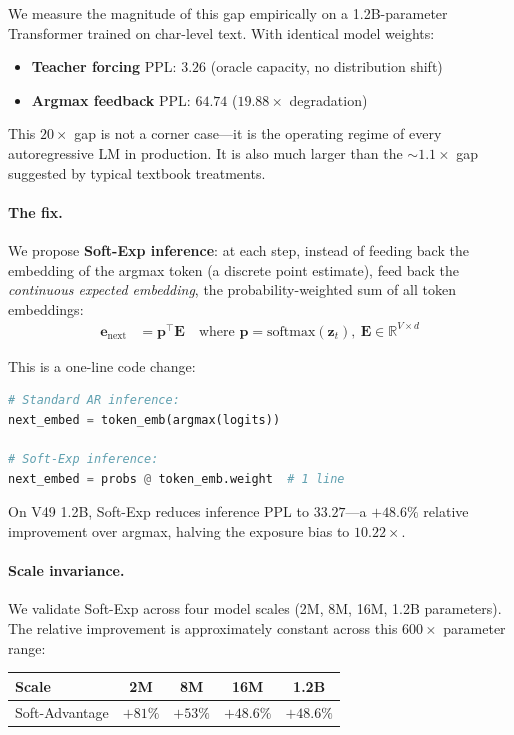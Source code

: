 \documentclass{article}
\begin{document}
We measure the magnitude of this gap empirically on a 1.2B-parameter Transformer trained on char-level text. With identical model weights:
\begin{itemize}
    \item \textbf{Teacher forcing} PPL: $3.26$ (oracle capacity, no distribution shift)
    \item \textbf{Argmax feedback} PPL: $64.74$ ($19.88\times$ degradation)
\end{itemize}

This $20\times$ gap is not a corner case---it is the operating regime of every autoregressive LM in production. It is also much larger than the $\sim 1.1\times$ gap suggested by typical textbook treatments.

\paragraph{The fix.} We propose \textbf{Soft-Exp inference}: at each step, instead of feeding back the embedding of the argmax token (a discrete point estimate), feed back the \emph{continuous expected embedding}, the probability-weighted sum of all token embeddings:
\begin{align*}
    \mathbf{e}_{\text{next}} &= \mathbf{p}^\top \mathbf{E} \quad \text{where } \mathbf{p} = \mathrm{softmax}(\mathbf{z}_t),\ \mathbf{E} \in \mathbb{R}^{V \times d}
\end{align*}

This is a one-line code change:
\begin{lstlisting}[language=Python]
# Standard AR inference:
next_embed = token_emb(argmax(logits))

# Soft-Exp inference:
next_embed = probs @ token_emb.weight  # 1 line
\end{lstlisting}

On V49 1.2B, Soft-Exp reduces inference PPL to $33.27$---a $+48.6\%$ relative improvement over argmax, halving the exposure bias to $10.22\times$.

\paragraph{Scale invariance.} We validate Soft-Exp across four model scales (2M, 8M, 16M, 1.2B parameters). The relative improvement is approximately constant across this $600\times$ parameter range:
\begin{center}
\small
\begin{tabular}{lcccc}
\toprule
Scale & 2M & 8M & 16M & 1.2B \\
\midrule
Soft-Advantage & $+81\%$ & $+53\%$ & $+48.6\%$ & $+48.6\%$ \\
\bottomrule
\end{tabular}
\end{center}
\end{document}
